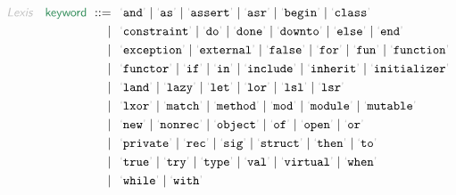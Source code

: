\begin{align*}
  \KEY{Lexis} \quad
     \SYN{keyword}
      \ ::= \ & \
      \LEX{and} \mid \LEX{as} \mid \LEX{assert} \mid \LEX{asr} \mid \LEX{begin} \mid \LEX{class} \\
      \ \mid \ & \ \LEX{constraint} \mid \LEX{do} \mid \LEX{done} \mid \LEX{downto} \mid \LEX{else} \mid \LEX{end} \\
      \ \mid \ & \ \LEX{exception} \mid \LEX{external} \mid \LEX{false} \mid \LEX{for} \mid \LEX{fun} \mid \LEX{function} \\
      \ \mid \ & \ \LEX{functor} \mid \LEX{if} \mid \LEX{in} \mid \LEX{include} \mid \LEX{inherit} \mid \LEX{initializer} \\
      \ \mid \ & \ \LEX{land} \mid \LEX{lazy} \mid \LEX{let} \mid \LEX{lor} \mid \LEX{lsl} \mid \LEX{lsr} \\
      \ \mid \ & \ \LEX{lxor} \mid \LEX{match} \mid \LEX{method} \mid \LEX{mod} \mid \LEX{module} \mid \LEX{mutable} \\
      \ \mid \ & \ \LEX{new} \mid \LEX{nonrec} \mid \LEX{object} \mid \LEX{of} \mid \LEX{open} \mid \LEX{or} \\
      \ \mid \ & \ \LEX{private} \mid \LEX{rec} \mid \LEX{sig} \mid \LEX{struct} \mid \LEX{then} \mid \LEX{to} \\
      \ \mid \ & \ \LEX{true} \mid \LEX{try} \mid \LEX{type} \mid \LEX{val} \mid \LEX{virtual} \mid \LEX{when} \\
      \ \mid \ & \ \LEX{while} \mid \LEX{with}
\end{align*}


